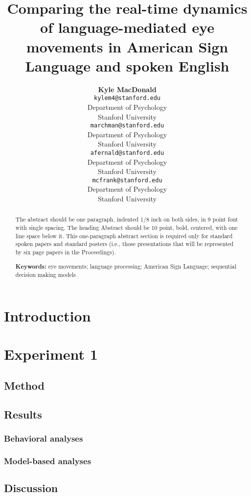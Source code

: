 \documentclass[10pt, letterpaper]{article}
\title{Comparing the real-time dynamics of language-mediated eye movements in
American Sign Language and spoken English}
\author{{\large \bf Kyle MacDonald} \\ \texttt{kylem4@stanford.edu} \\ Department of Psychology \\ Stanford University \And {\large \bf Virginia Marchman} \\ \texttt{marchman@stanford.edu} \\ Department of Psychology \\ Stanford University
    \And {\large \bf Anne Fernald} \\ \texttt{afernald@stanford.edu} \\ Department of Psychology \\ Stanford University
\And {\large \bf Michael C. Frank} \\ \texttt{mcfrank@stanford.edu} \\ Department of Psychology \\ Stanford University}
\begin{document}
\maketitle

\begin{abstract}
The abstract should be one paragraph, indented 1/8 inch on both sides,
in 9 point font with single spacing. The heading Abstract should be 10
point, bold, centered, with one line space below it. This one-paragraph
abstract section is required only for standard spoken papers and
standard posters (i.e., those presentations that will be represented by
six page papers in the Proceedings).

\textbf{Keywords:}
eye movements; language processing; American Sign Language; sequential
decision making models
\end{abstract}

\section{Introduction}\label{introduction}

\section{Experiment 1}\label{experiment-1}

\subsection{Method}\label{method}

\subsection{Results}\label{results}

\subsubsection{Behavioral analyses}\label{behavioral-analyses}

\subsubsection{Model-based analyses}\label{model-based-analyses}

\subsection{Discussion}\label{discussion}
\end{document}
